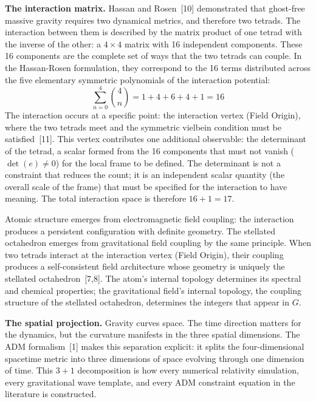 \documentclass[11pt]{article}
\begin{document}
\textbf{The interaction matrix.}\quad
Hassan and Rosen~[10] demonstrated that ghost-free massive gravity requires two dynamical metrics, and therefore two tetrads.
The interaction between them is described by the matrix product of one tetrad with the inverse of the other: a $4 \times 4$ matrix with 16 independent components.
These 16 components are the complete set of ways that the two tetrads can couple.
In the Hassan-Rosen formulation, they correspond to the 16 terms distributed across the five elementary symmetric polynomials of the interaction potential:
%
\begin{equation*}
\sum_{n=0}^{4} \binom{4}{n} = 1 + 4 + 6 + 4 + 1 = 16
\end{equation*}
%
The interaction occurs at a specific point: the interaction vertex (Field Origin), where the two tetrads meet and the symmetric vielbein condition must be satisfied~[11].
This vertex contributes one additional observable: the determinant of the tetrad, a scalar formed from the 16 components that must not vanish ($\det(e) \neq 0$) for the local frame to be defined.
The determinant is not a constraint that reduces the count; it is an independent scalar quantity (the overall scale of the frame) that must be specified for the interaction to have meaning.
The total interaction space is therefore $16 + 1 = 17$.

Atomic structure emerges from electromagnetic field coupling: the interaction produces a persistent configuration with definite geometry.
The stellated octahedron emerges from gravitational field coupling by the same principle.
When two tetrads interact at the interaction vertex (Field Origin), their coupling produces a self-consistent field architecture whose geometry is uniquely the stellated octahedron~[7,8].
The atom's internal topology determines its spectral and chemical properties; the gravitational field's internal topology, the coupling structure of the stellated octahedron, determines the integers that appear in $G$.

\textbf{The spatial projection.}\quad
Gravity curves space.
The time direction matters for the dynamics, but the curvature manifests in the three spatial dimensions.
The ADM formalism~[1] makes this separation explicit: it splits the four-dimensional spacetime metric into three dimensions of space evolving through one dimension of time.
This $3+1$ decomposition is how every numerical relativity simulation, every gravitational wave template, and every ADM constraint equation in the literature is constructed.
\end{document}
